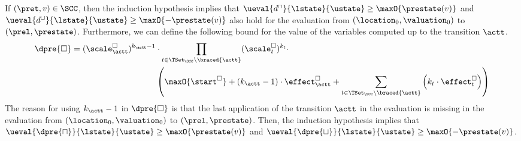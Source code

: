 If $(\pret, v) \in \SCC$, then the induction hypothesis implies that $\ueval{d^\sqcap}{\lstate}{\ustate} \geq \maxO{\prestate(v)}$ and $\ueval{d^\sqcup}{\lstate}{\ustate} \geq \maxO{-\prestate(v)}$ also hold for the evaluation from $(\location_0, \valuation_0)$ to $(\prel, \prestate)$.
Furthermore, we can define the following bound for the value of the variables computed up to the transition $\actt$.
\begin{equation} \label{eq:induction_consequence}
  \begin{split}
  \dpre{\square} = (\scale^\square_\actt)^{k_\actt - 1} &\cdot \prod_{t \in \TSet_\SCC \setminus \braced{\actt}} (\scale^\square_t)^{k_t} \cdot \\
  & \left( \maxO{\start^\square} + \left( k_\actt - 1 \right) \cdot \effect^\square_\actt + \sum_{t \in \TSet_\SCC \setminus \braced{\actt}} \left( k_t \cdot \effect^\square_t \right) \right)
  \end{split}
\end{equation}
The reason for using $k_\actt - 1$ in $\dpre{\square}$ is that the last application of the transition $\actt$ in the evaluation is missing in the evaluation from $(\location_0, \valuation_0)$ to $(\prel, \prestate)$.
Then, the induction hypothesis implies that $\ueval{\dpre{\sqcap}}{\lstate}{\ustate} \geq \maxO{\prestate(v)}$ and $\ueval{\dpre{\sqcup}}{\lstate}{\ustate} \geq \maxO{-\prestate(v)}$.

